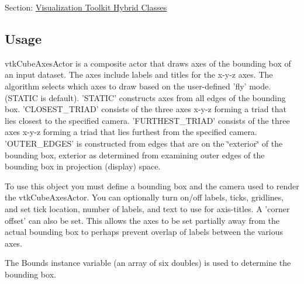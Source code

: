 Section\-: \hyperlink{sec_vtkhybrid}{Visualization Toolkit Hybrid Classes} \hypertarget{vtkwidgets_vtkxyplotwidget_Usage}{}\subsection{Usage}\label{vtkwidgets_vtkxyplotwidget_Usage}
vtk\-Cube\-Axes\-Actor is a composite actor that draws axes of the bounding box of an input dataset. The axes include labels and titles for the x-\/y-\/z axes. The algorithm selects which axes to draw based on the user-\/defined 'fly' mode. (S\-T\-A\-T\-I\-C is default). 'S\-T\-A\-T\-I\-C' constructs axes from all edges of the bounding box. 'C\-L\-O\-S\-E\-S\-T\-\_\-\-T\-R\-I\-A\-D' consists of the three axes x-\/y-\/z forming a triad that lies closest to the specified camera. 'F\-U\-R\-T\-H\-E\-S\-T\-\_\-\-T\-R\-I\-A\-D' consists of the three axes x-\/y-\/z forming a triad that lies furthest from the specified camera. 'O\-U\-T\-E\-R\-\_\-\-E\-D\-G\-E\-S' is constructed from edges that are on the \char`\"{}exterior\char`\"{} of the bounding box, exterior as determined from examining outer edges of the bounding box in projection (display) space.

To use this object you must define a bounding box and the camera used to render the vtk\-Cube\-Axes\-Actor. You can optionally turn on/off labels, ticks, gridlines, and set tick location, number of labels, and text to use for axis-\/titles. A 'corner offset' can also be set. This allows the axes to be set partially away from the actual bounding box to perhaps prevent overlap of labels between the various axes.

The Bounds instance variable (an array of six doubles) is used to determine the bounding box.


